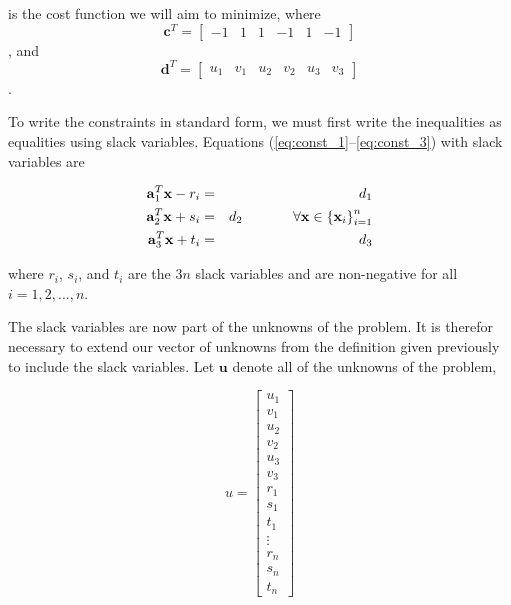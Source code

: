 \documentclass{article}
\begin{document}
\noindent is the cost function we will aim to minimize, where \[\mathbf{c}^T = \begin{bmatrix}-1 & 1 & 1 & -1 & 1 & -1\end{bmatrix}\], and \[\mathbf{d}^T = \begin{bmatrix}u_1 & v_1 & u_2 & v_2 & u_3 & v_3\end{bmatrix}\].

To write the constraints in standard form, we must first write the inequalities as equalities using slack variables.
Equations (\ref{eq:const_1}--\ref{eq:const_3}) with slack variables are

\begin{eqnarray}
\label{eq:lp_const_1} \mathbf{a}_1^T \mathbf{x} - r_i &=& d_1\\
\label{eq:lp_const_2} \mathbf{a}_2^T \mathbf{x} + s_i &=& d_2 \hspace{0.5in} \forall{\mathbf{x}} \in \left\{ \mathbf{x}_i \right\}_{i=1}^n\\
\label{eq:lp_const_3} \mathbf{a}_3^T \mathbf{x} + t_i &=& d_3
\end{eqnarray}

\noindent where $r_i$, $s_i$, and $t_i$ are the $3n$ slack variables and are non-negative for all $i = 1, 2, ..., n$.

The slack variables are now part of the unknowns of the problem.
It is therefor necessary to extend our vector of unknowns from the definition given previously to include the slack variables.
Let $\mathbf{u}$ denote all of the unknowns of the problem,

\begin{equation} \label{eq:u}
u = \begin{bmatrix}
u_1 \\ v_1 \\ u_2 \\ v_2 \\ u_3 \\ v_3 \\
r_1 \\ s_1 \\ t_1 \\ %
\vdots \\ r_n \\ s_n \\ t_n
\end{bmatrix}
\end{equation}
\end{document}
